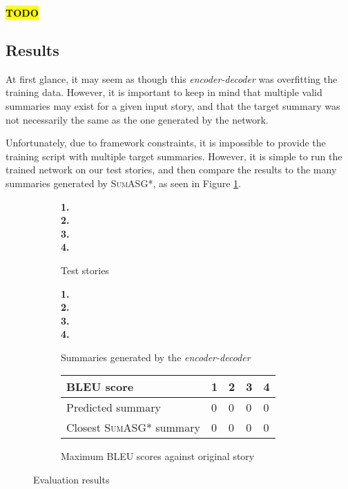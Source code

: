 \textcolor{red}{\textbf{\hl{TODO}}}

\subsection{Results}

At first glance, it may seem as though this \textit{encoder-decoder} was overfitting the training data. However, it is important to keep in mind that multiple valid summaries may exist for a given input story, and that the target summary was not necessarily the same as the one generated by the network.

Unfortunately, due to framework constraints, it is impossible to provide the training script with multiple target summaries. However, it is simple to run the trained network on our test stories, and then compare the results to the many summaries generated by \textsc{SumASG*}, as seen in Figure \ref{fig:neural_network_testing}.

\begin{figure}[H]
\begin{subfigure}{\textwidth}
\begin{displayquote}
\textbf{1.}\\
\textbf{2.}\\
\textbf{3.}\\
\textbf{4.}\\
\end{displayquote}
\caption{Test stories}
\end{subfigure}
\begin{subfigure}{\textwidth}
\vspace{\baselineskip}
\begin{displayquote}
\textbf{1.}\\
\textbf{2.}\\
\textbf{3.}\\
\textbf{4.}\\
\end{displayquote}
\caption{Summaries generated by the \textit{encoder-decoder}}
\end{subfigure}
\begin{subfigure}{\textwidth}
\vspace{\baselineskip}
\centering
\begin{tabular}{@{}lllll@{}}
\toprule
BLEU score                                        & 1 & 2 & 3 & 4 \\ \midrule
Predicted summary                                 & 0 & 0 & 0 & 0 \\
Closest \textsc{SumASG*} summary & 0 & 0 & 0 & 0 \\ \bottomrule
\end{tabular}
\caption{Maximum BLEU scores against original story}
\end{subfigure}
\caption{Evaluation results}
\label{fig:neural_network_testing}
\end{figure}

